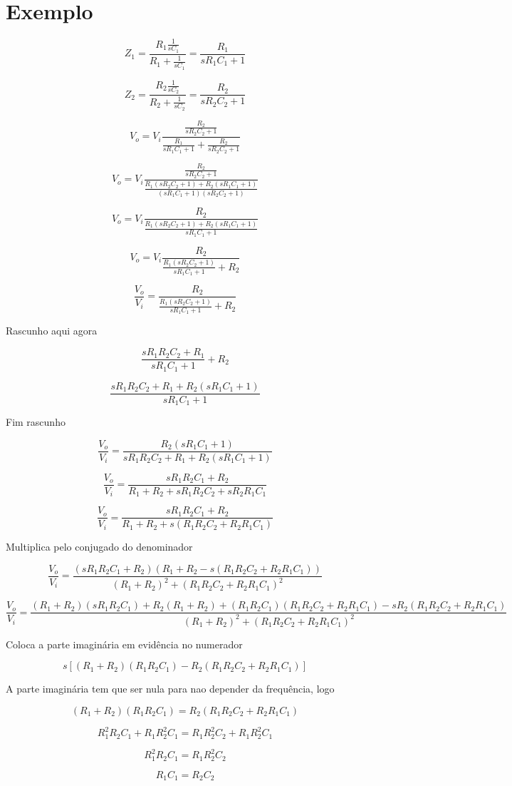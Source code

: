 \documentclass[12pt]{scrartcl}
\begin{document}
\section*{Exemplo}

\[ Z_1 = \frac{R_1\frac{1}{sC_1}}{R_1 + \frac{1}{sC_1}} = \frac{R_1}{sR_1C_1 + 1} \]

\[ Z_2 = \frac{R_2\frac{1}{sC_2}}{R_2 + \frac{1}{sC_2}} = \frac{R_2}{sR_2C_2 + 1} \]

\[ V_o = V_i \frac{\frac{R_2}{sR_2C_2 + 1}}{\frac{R_1}{sR_1C_1 + 1} + \frac{R_2}{sR_2C_2 + 1}}  \]

\[ V_o = V_i \frac{\frac{R_2}{sR_2C_2 + 1}}{\frac{R_1(sR_2C_2 + 1) + R_2(sR_1C_1 + 1)}{(sR_1C_1 + 1)(sR_2C_2 + 1)}}  \]

\[ V_o = V_i \frac{R_2}{\frac{R_1(sR_2C_2 + 1) + R_2(sR_1C_1 + 1)}{sR_1C_1 + 1}}  \]

\[ V_o = V_i \frac{R_2}{\frac{R_1(sR_2C_2 + 1)}{sR_1C_1 + 1} + R_2}  \]

\[ \frac{V_o}{V_i} = \frac{R_2}{\frac{R_1(sR_2C_2 + 1)}{sR_1C_1 + 1} + R_2}  \]

Rascunho aqui agora

\[ \frac{sR_1R_2C_2 + R_1}{sR_1C_1 + 1} + R_2 \]

\[ \frac{sR_1R_2C_2 + R_1 + R_2(sR_1C_1 + 1)}{sR_1C_1 + 1} \]

Fim rascunho

\[ \frac{V_o}{V_i} = \frac{R_2(sR_1C_1 + 1)}{sR_1R_2C_2 + R_1 + R_2(sR_1C_1 + 1)}  \]

\[ \frac{V_o}{V_i} = \frac{sR_1R_2C_1 + R_2}{R_1 + R_2 + sR_1R_2C_2 + sR_2R_1C_1}  \]

\[ \frac{V_o}{V_i} = \frac{sR_1R_2C_1 + R_2}{R_1 + R_2 + s(R_1R_2C_2 + R_2R_1C_1)}  \]

Multiplica pelo conjugado do denominador

\[ \frac{V_o}{V_i} = \frac{(sR_1R_2C_1 + R_2) (R_1 + R_2 - s(R_1R_2C_2 + R_2R_1C_1))}{(R_1 + R_2)^2 + (R_1R_2C_2 + R_2R_1C_1)^2}  \]

\[ \frac{V_o}{V_i} = \frac{(R_1 + R_2)(sR_1R_2C_1) + R_2(R_1 + R_2) + (R_1R_2C_1)(R_1R_2C_2 + R_2R_1C_1) - sR_2(R_1R_2C_2 + R_2R_1C_1)}{(R_1 + R_2)^2 + (R_1R_2C_2 + R_2R_1C_1)^2}  \]

Coloca a parte imaginária em evidência no numerador

\[ s[(R_1 + R_2)(R_1R_2C_1) - R_2(R_1R_2C_2 + R_2R_1C_1)] \]

A parte imaginária tem que ser nula para nao depender da frequência, logo

\[ (R_1 + R_2)(R_1R_2C_1) = R_2(R_1R_2C_2 + R_2R_1C_1) \]

\[ R_1^2R_2C_1 + R_1R_2^2C_1 = R_1R_2^2C_2 + R_1R_2^2C_1 \]

\[ R_1^2R_2C_1 = R_1R_2^2C_2 \]

\[ \boxed{ R_1C_1 = R_2C_2} \]
\end{document}
